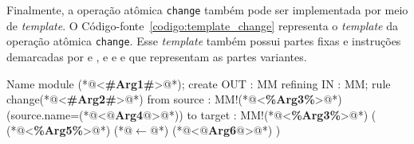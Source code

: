 Finalmente, a operação atômica \texttt{change} também pode ser implementada por meio de \textit{template}. O Código-fonte~\ref{codigo:template_change} representa o \textit{template} da operação atômica \texttt{change}. Esse \textit{template} também possui partes fixas e instruções demarcadas por \aspas{\textbf{<\#}} e \aspas{\textbf{\#>}}, \aspas{\textbf{<\%}} e \aspas{\textbf{\%>}} e  e  que representam as partes variantes.

\begin{codigo}[caption={[\textit{Template} para realizar a operação atômica \texttt{change}.] \textit{Template} para realizar a operação atômica \texttt{change}.},escapeinside={(*@}{@*)}, basicstyle=\footnotesize, label={codigo:template_change}, language=ATL]{Name}
module (*@<\textbf{\#Arg1\#}>@*);
create OUT : MM refining IN : MM;
rule change(*@<\textbf{\#Arg2\#}>@*) {
	from
		source : MM!(*@<\textbf{\%Arg3\%}>@*) (source.name=(*@<\textbf{$@$Arg4$@$}>@*))
	to 
		target : MM!(*@<\textbf{\%Arg3\%}>@*) (
			(*@<\textbf{\%Arg5\%}>@*) (*@$\leftarrow$@*) (*@<\textbf{$@$Arg6$@$}>@*)
		)
}
\end{codigo}

